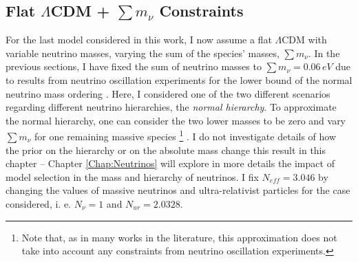 \subsection{Flat $\Lambda$CDM + $\sum m_\nu$ Constraints}\label{Sec:nCDM}
For the last model considered in this work, I now assume a flat $\Lambda$CDM with variable neutrino masses, varying the sum of the species' masses, $\sum m_{\nu}$. In the previous sections, I have fixed the sum of neutrino masses to $\sum m_{\nu} = 0.06 \, eV$ due to results from neutrino oscillation experiments for the lower bound of the normal neutrino mass ordering \citep{2003HannestadNeutrino,2006NeutrinoReview,2016Hannestad}. Here, I considered one of the two different scenarios regarding different neutrino hierarchies, the \textit{normal hierarchy}.  To approximate the normal hierarchy, one can consider the two lower masses to be zero and vary $\sum m_{\nu}$ for one remaining massive species \footnote{Note that, as in many works in the literature, this approximation does not take into account any constraints from neutrino oscillation experiments.} \citep{2003HannestadNeutrino,2014Battye-Deg-1Mass,2016Giusarma-Deg-InvApp-NormAppr,PlanckCosmology2016}. I do not investigate details of how the prior on the hierarchy or on the absolute mass change this result in this chapter  -- Chapter \ref{Chap:Neutrinos} will explore in more details the impact of model selection in the mass and hierarchy of neutrinos. I fix $N_{eff} = 3.046$ by changing the values of massive neutrinos and ultra-relativist particles for the case considered, i. e. $N_{\nu} = 1$ and $N_{ur} = 2.0328$.

